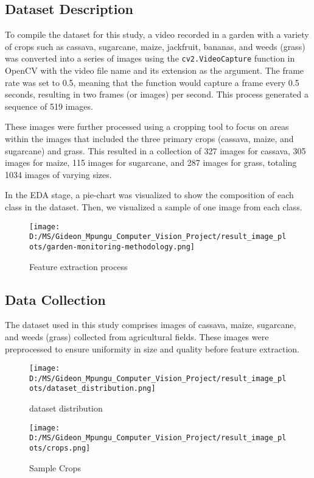 \documentclass[10pt,twocolumn,letterpaper]{article}
\begin{document}
\subsection{Dataset Description}

To compile the dataset for this study, a video recorded in a garden with a variety of crops such as cassava, sugarcane, maize, jackfruit, bananas, and weeds (grass) was converted into a series of images using the \texttt{cv2.VideoCapture} function in OpenCV with the video file name and its extension as the argument. The frame rate was set to 0.5, meaning that the function would capture a frame every 0.5 seconds, resulting in two frames (or images) per second. This process generated a sequence of 519 images.

These images were further processed using a cropping tool to focus on areas within the images that included the three primary crops (cassava, maize, and sugarcane) and grass. This resulted in a collection of 327 images for cassava, 305 images for maize, 115 images for sugarcane, and 287 images for grass, totaling 1034 images of varying sizes.

In the EDA stage, a pie-chart was visualized to show the composition of each class in the dataset. Then, we visualized a sample of one image from each class.


\begin{figure}[h]
    \texttt{[image: D:/MS/Gideon\_Mpungu\_Computer\_Vision\_Project/result\_image\_plots/garden-monitoring-methodology.png]}
    \caption{Feature extraction process}
    \label{fig:feature_extraction}
\end{figure}

\subsection{Data Collection}
The dataset used in this study comprises images of cassava, maize, sugarcane, and weeds (grass) collected from agricultural fields. These images were preprocessed to ensure uniformity in size and quality before feature extraction.

\begin{figure}[h]
    \texttt{[image: D:/MS/Gideon\_Mpungu\_Computer\_Vision\_Project/result\_image\_plots/dataset\_distribution.png]}
    \caption{dataset distribution}
    \label{fig:pie_chart}
\end{figure}

\begin{figure}[h]
    \texttt{[image: D:/MS/Gideon\_Mpungu\_Computer\_Vision\_Project/result\_image\_plots/crops.png]}
    \caption{Sample Crops}
    \label{fig:crops}
\end{figure}
\end{document}
